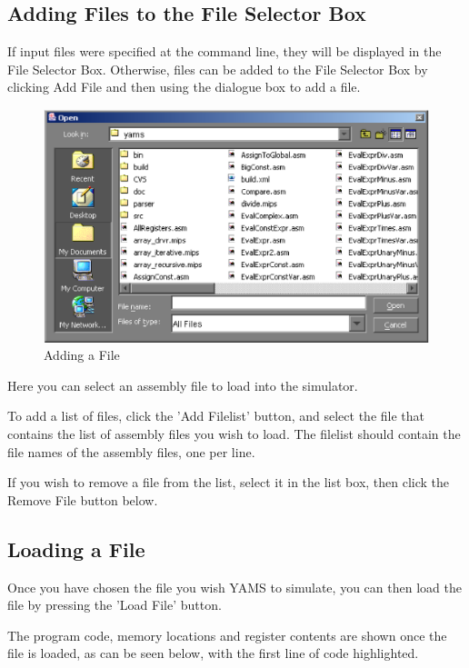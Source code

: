 \subsection{Adding Files to the File Selector Box}
If input files were specified at the command line, they will be displayed in the File Selector Box. Otherwise, files can be added to the File Selector Box by clicking Add File and then using the dialogue box to add a file.

\begin{figure}[h]
\centering
\includegraphics[scale=0.5]{Ch4-Fig3.eps}
\caption{Adding a File}
\label{figure.Adding a File}
\end{figure}

Here you can select an assembly file to load into the simulator.

To add a list of files, click the 'Add Filelist' button, and select the file that contains the list of assembly files you wish to load.  The filelist should contain the file names of the assembly files, one per line.

If you wish to remove a file from the list, select it in the list box, then click the Remove File button below.


\subsection{Loading a File}
Once you have chosen the file you wish YAMS to simulate, you can then load the file by pressing the 'Load File' button.

The program code, memory locations and register contents are shown once the file is loaded, as can be seen below, with the first line of code highlighted.

